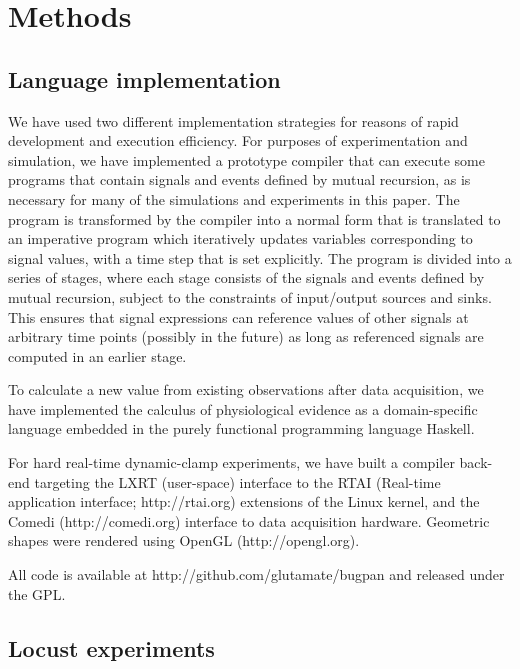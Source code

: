 \section*{Methods}

\subsection*{Language implementation} 

We have used two different implementation strategies for reasons of
rapid development and execution efficiency. For purposes of
experimentation and simulation, we have implemented a prototype
compiler that can execute some programs that contain signals and
events defined by mutual recursion, as is necessary for many of the
simulations and experiments in this paper. The program is transformed
by the compiler into a normal form that is translated to an imperative
program which iteratively updates variables corresponding to signal
values, with a time step that is set explicitly. The program is
divided into a series of stages, where each stage consists of the
signals and events defined by mutual recursion, subject to the
constraints of input/output sources and sinks. This ensures that
signal expressions can reference values of other signals at arbitrary
time points (possibly in the future) as long as referenced signals are
computed in an earlier stage.

To calculate a new value from existing observations after data
acquisition, we have implemented the calculus of physiological
evidence as a domain-specific language embedded in the purely functional
programming language Haskell. 

For hard real-time dynamic-clamp experiments, we have built a compiler
back-end targeting the LXRT (user-space) interface to the RTAI (Real-time
application interface; http://rtai.org) extensions of the Linux
kernel, and the Comedi (http://comedi.org) interface to data
acquisition hardware. Geometric shapes were rendered using OpenGL
(http://opengl.org).

All code is available at http://github.com/glutamate/bugpan and
released under the GPL.

\subsection*{Locust experiments}

